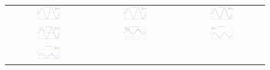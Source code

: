 \documentclass[12pt]{article}
\begin{document}
\begin{figure}[p]
  \centering
  \begin{tabular}{ccc}
    \includegraphics[width=0.3\textwidth]{figures/plot_11.png} &
    \includegraphics[width=0.3\textwidth]{figures/plot_12.png} &
    \includegraphics[width=0.3\textwidth]{figures/plot_13.png} \\
    \includegraphics[width=0.3\textwidth]{figures/plot_14.png} &
    \includegraphics[width=0.3\textwidth]{figures/plot_15.png} &
    \includegraphics[width=0.3\textwidth]{figures/plot_16.png} \\
    \includegraphics[width=0.3\textwidth]{figures/plot_17.png} &

\end{tabular}
\end{figure}
\end{document}
